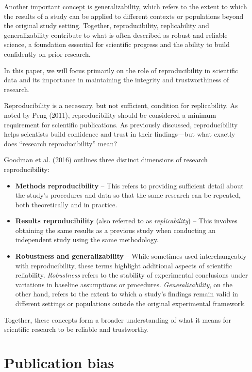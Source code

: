 \documentclass[
  british,
  a4paper,
]{article}
\providecommand{\tightlist}{%
  \setlength{\itemsep}{0pt}\setlength{\parskip}{0pt}}
\begin{document}
Another important concept is generalizability, which refers to the
extent to which the results of a study can be applied to different
contexts or populations beyond the original study setting. Together,
reproducibility, replicability and generalizability contribute to what
is often described as robust and reliable science, a foundation
essential for scientific progress and the ability to build confidently
on prior research.

In this paper, we will focus primarily on the role of reproducibility in
scientific data and its importance in maintaining the integrity and
trustworthiness of research.

Reproducibility is a necessary, but not sufficient, condition for
replicability. As noted by Peng (2011), reproducibility should be
considered a minimum requirement for scientific publications. As
previously discussed, reproducibility helps scientists build confidence
and trust in their findings---but what exactly does ``research
reproducibility'' mean?

Goodman et al. (2016) outlines three distinct dimensions of research
reproducibility:

\begin{itemize}
\tightlist
\item
  \textbf{Methods reproducibility} -- This refers to providing
  sufficient detail about the study's procedures and data so that the
  same research can be repeated, both theoretically and in practice.
\item
  \textbf{Results reproducibility} (also referred to as
  \emph{replicability}) -- This involves obtaining the same results as a
  previous study when conducting an independent study using the same
  methodology.
\item
  \textbf{Robustness and generalizability} -- While sometimes used
  interchangeably with reproducibility, these terms highlight additional
  aspects of scientific reliability. \emph{Robustness} refers to the
  stability of experimental conclusions under variations in baseline
  assumptions or procedures. \emph{Generalizability}, on the other hand,
  refers to the extent to which a study's findings remain valid in
  different settings or populations outside the original experimental
  framework.
\end{itemize}

Together, these concepts form a broader understanding of what it means
for scientific research to be reliable and trustworthy.

\section{Publication bias}\label{publication-bias}
\end{document}
